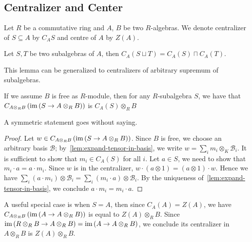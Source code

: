 \subsection{Centralizer and Center}
Let $R$ be a commutative ring and $A$, $B$ be two $R$-algebras. We denote
centralizer of $S\subseteq A$ by $C_{A}S$ and centre of $A$ by $Z(A)$.

\begin{lemma}\label{lem:sup-centralizer}
  Let $S, T$ be two subalgebras of $A$, then
  $C_{A}(S\sqcup T)=C_{A}(S)\sqcap C_{A}(T)$. \leanok
\end{lemma}
This lemma can be generalized to centralizers of arbitrary supremum of
subalgebras.

\begin{lemma}\label{lem:centralizer-inclusion-tensor}
  If we assume $B$ is free as $R$-module, then for any $R$-subalgebra $S$, we
  have that $C_{A\otimes_{R}B}\left(\operatorname{im}\left(S\to A\otimes_{R}B\right)\right)$
  is $C_{A}(S) \otimes_{R} B$
  \leanok
\end{lemma}
A symmetric statement goes without saying.
\begin{proof}
  Let $w\in C_{A\otimes_{R}B}\left(\operatorname{im}\left(S\to A\otimes_{R}B\right)\right)$.
  Since $B$ is free, we choose an arbitrary basis $\mathcal{B}$;
  by~\cref{lem:expand-tensor-in-basis}, we write
  $w = \sum_{i}m_{i}\otimes_{K}\mathcal{B}_{i}$. It is sufficient to show that
  $m_{i}\in C_{A}(S)$ for all $i$. Let $a \in S$, we need to show that
  $m_{i}\cdot a = a \cdot m_{i}$. Since $w$ is in the centralizer,
  $w \cdot (a\otimes 1) = (a\otimes 1)\cdot w$. Hence we have
  $\sum_{i}(a\cdot m_{i})\otimes\mathcal{B}_{i}=\sum_{i}(m_{i}\cdot a)\otimes\mathcal{B}_{i}$.
  By the uniqueness of~\cref{lem:expand-tensor-in-basis}, we conclude
  $a\cdot m_{i}=m_{i}\cdot a$.
\end{proof}

\begin{remark}
  A useful special case is when $S=A$, then since $C_{A}(A)=Z(A)$, we have
  $C_{A\otimes_{R}B}\left(\operatorname{im}\left(A\to A\otimes_{R} B\right)\right)$ is equal
  to $Z(A)\otimes_{R} B$. Since
  $\operatorname{im}\left(R\otimes_{R}B\to A\otimes_{R}B\right)=\operatorname{im}\left(A\to A\otimes_{R}B\right)$,
  we conclude its centralizer in $A\otimes_{R}B$ is $Z(A)\otimes_{R}B$.
\end{remark}

